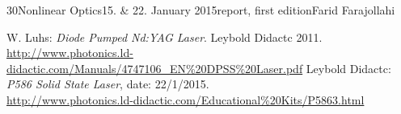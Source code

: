 \documentclass[a4paper, parskip=half, 12pt, bibliography=totocnumbered]{scrartcl}
\begin{document}
{30}{Nonlinear Optics}{15. \& 22. January 2015}{report, first edition}{Farid Farajollahi}{}





\begin{thebibliography}{10}
 W. Luhs: \emph{Diode Pumped Nd:YAG Laser}. Leybold Didactc 2011.\\
\url{http://www.photonics.ld-didactic.com/Manuals/4747106_EN%20DPSS%20Laser.pdf}
 Leybold Didactc: \emph{P586 Solid State Laser}, date: 22/1/2015.\\
\url{http://www.photonics.ld-didactic.com/Educational%20Kits/P5863.html}
\end{thebibliography}
\end{document}
